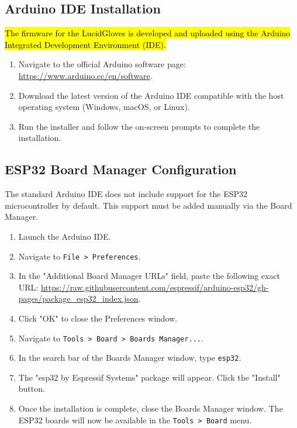 \documentclass{article}
\begin{document}
\subsection{Arduino IDE Installation}
\hl{The firmware for the LucidGloves is developed and uploaded using the Arduino Integrated Development Environment (IDE).}
\begin{enumerate}
    \item Navigate to the official Arduino software page: \url{https://www.arduino.cc/en/software}.
    \item Download the latest version of the Arduino IDE compatible with the host operating system (Windows, macOS, or Linux).
    \item Run the installer and follow the on-screen prompts to complete the installation.
\end{enumerate}

\subsection{ESP32 Board Manager Configuration}
The standard Arduino IDE does not include support for the ESP32 microcontroller by default. This support must be added manually via the Board Manager.
\begin{enumerate}
    \item Launch the Arduino IDE.
    \item Navigate to \texttt{File > Preferences}.
    \item In the "Additional Board Manager URLs" field, paste the following exact URL: \url{https://raw.githubusercontent.com/espressif/arduino-esp32/gh-pages/package_esp32_index.json}.
    \item Click "OK" to close the Preferences window.
    \item Navigate to \texttt{Tools > Board > Boards Manager...}.
    \item In the search bar of the Boards Manager window, type \texttt{esp32}.
    \item The "esp32 by Espressif Systems" package will appear. Click the "Install" button.
    \item Once the installation is complete, close the Boards Manager window. The ESP32 boards will now be available in the \texttt{Tools > Board} menu.
\end{enumerate}
\end{document}
